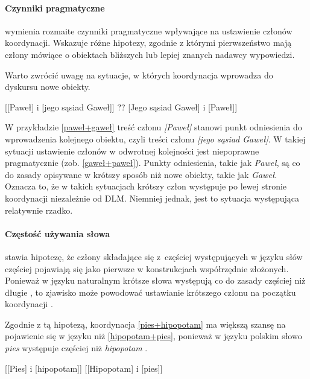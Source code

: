 \paragraph{Czynniki pragmatyczne} 

\cite{lohmann2014english} wymienia rozmaite czynniki pragmatyczne wpływające na ustawienie członów koordynacji. Wskazuje różne hipotezy, zgodnie z którymi pierwszeństwo mają człony mówiące o obiektach bliższych lub lepiej znanych nadawcy wypowiedzi. 

Warto zwrócić uwagę na sytuacje, w których koordynacja wprowadza do dyskursu nowe obiekty.

\begin{exe}
\ex \label{paweł+gaweł} {[[Paweł] i [jego sąsiad Gaweł]]}
\ex \label{gaweł+paweł} {?? [Jego sąsiad Gaweł] i [Paweł]]}
\end{exe}

W przykładzie \eqref{paweł+gaweł} treść członu \textit{[Paweł]} stanowi punkt odniesienia do wprowadzenia kolejnego obiektu, czyli treści członu \textit{[jego sąsiad Gaweł]}. W takiej sytuacji ustawienie członów w odwrotnej kolejności jest niepoprawne pragmatycznie (zob. \eqref{gaweł+paweł}). Punkty odniesienia, takie jak \textit{Paweł}, są co do zasady opisywane w krótszy sposób niż nowe obiekty, takie jak \textit{Gaweł}. Oznacza to, że w takich sytuacjach krótszy człon występuje po lewej stronie koordynacji niezależnie od DLM. Niemniej jednak, jest to sytuacja występująca relatywnie rzadko.

\paragraph{Częstość używania słowa}
\cite{fenk1989word} stawia hipotezę, że człony składające się z~częściej występujących w języku słów  częściej pojawiają się jako pierwsze w konstrukcjach współrzędnie złożonych. Ponieważ w języku naturalnym krótsze słowa występują co do zasady częściej niż długie \citep{zipf1946psychology}, to zjawisko może powodować ustawianie krótszego członu na początku koordynacji \citep[s. 54]{lohmann2014english}.

Zgodnie z tą hipotezą, koordynacja \eqref{pies+hipopotam} ma większą szansę na pojawienie się w języku niż \eqref{hipopotam+pies}, ponieważ w języku polskim słowo \textit{pies} występuje częściej niż \textit{hipopotam} \citep{przepiorkowski2012narodowy}.

\begin{exe}
\ex \label{pies+hipopotam} {[[Pies] i [hipopotam]]}
\ex \label{hipopotam+pies} {[[Hipopotam] i [pies]]}
\end{exe}

